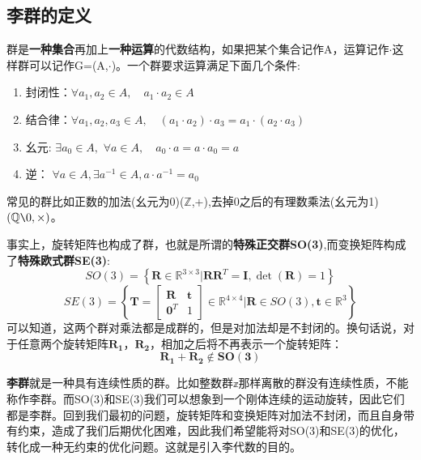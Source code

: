 \subsection{李群的定义}
群是\textbf{一种集合}再加上\textbf{一种运算}的代数结构，如果把某个集合记作A，运算记作$\cdot$这样群可以记作G=(A,$\cdot$)。一个群要求运算满足下面几个条件:
\begin{enumerate}
\item 封闭性：$\forall a_{1}, a_{2} \in A, \quad a_{1}\cdot a_{2} \in A$
\item 结合律：$\forall a_{1}, a_{2}, a_{3} \in A,\quad \left(a_{1} \cdot a_{2}\right) \cdot a_{3}=a_{1} \cdot\left(a_{2} \cdot a_{3}\right)$
\item 幺元:  $\exists a_{0} \in A,$ $\forall a \in A,\quad a_{0} \cdot a=a \cdot a_{0}=a$
\item 逆：   $\forall a \in A, \exists a^{-1} \in A,$\quad $a \cdot a^{-1}=a_{0}$
\end{enumerate}
常见的群比如正数的加法(幺元为0)($\mathbb{Z}$,+),去掉0之后的有理数乘法(幺元为1)$(\mathbb{Q} \verb|\|0,\times)$。\par
事实上，旋转矩阵也构成了群，也就是所谓的\textbf{特殊正交群SO(3)},而变换矩阵构成了\textbf{特殊欧式群SE(3)}:
\begin{equation}
SO(3)=\left\{\mathbf{R} \in \mathbb{R}^{3 \times 3} | \mathbf{RR}^{T}=\mathbf{I}, \operatorname{det}(\mathbf{R})=1\right\}
\end{equation}
\begin{equation}
SE(3)=\left\{\mathbf{T}=\left[ \begin{array}{ll}{\boldsymbol{R}} & {\boldsymbol{t}} \\ {\mathbf{0}^{T}} & {1}\end{array}\right] \in \mathbb{R}^{4 \times 4} | \boldsymbol{R} \in SO(3), \boldsymbol{t} \in \mathbb{R}^{3}\right\}
\end{equation}
可以知道，这两个群对乘法都是成群的，但是对加法却是不封闭的。换句话说，对于任意两个旋转矩阵$\boldsymbol{R_1}$，$\boldsymbol{R_2}$，相加之后将不再表示一个旋转矩阵：
\begin{equation}
\boldsymbol{R_1}+\boldsymbol{R_2}\notin \boldsymbol{SO(3)}
\end{equation}\par
\textbf{李群}就是一种具有连续性质的群。比如整数群$\mathbb{z}$那样离散的群没有连续性质，不能称作李群。而SO(3)和SE(3)我们可以想象到一个刚体连续的运动旋转，因此它们都是李群。回到我们最初的问题，旋转矩阵和变换矩阵对加法不封闭，而且自身带有约束，造成了我们后期优化困难，因此我们希望能将对SO(3)和SE(3)的优化，转化成一种无约束的优化问题。这就是引入李代数的目的。
